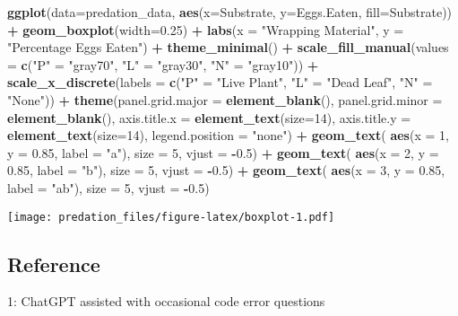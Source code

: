 \documentclass[
]{article}
\newenvironment{Shaded}{\begin{snugshade}}{\end{snugshade}}
\newcommand{\AttributeTok}[1]{\textcolor[rgb]{0.13,0.29,0.53}{#1}}
\newcommand{\DecValTok}[1]{\textcolor[rgb]{0.00,0.00,0.81}{#1}}
\newcommand{\FloatTok}[1]{\textcolor[rgb]{0.00,0.00,0.81}{#1}}
\newcommand{\FunctionTok}[1]{\textcolor[rgb]{0.13,0.29,0.53}{\textbf{#1}}}
\newcommand{\NormalTok}[1]{#1}
\newcommand{\OtherTok}[1]{\textcolor[rgb]{0.56,0.35,0.01}{#1}}
\newcommand{\SpecialCharTok}[1]{\textcolor[rgb]{0.81,0.36,0.00}{\textbf{#1}}}
\newcommand{\StringTok}[1]{\textcolor[rgb]{0.31,0.60,0.02}{#1}}
\begin{document}
\begin{Shaded}
\begin{Highlighting}[]
\FunctionTok{ggplot}\NormalTok{(}\AttributeTok{data=}\NormalTok{predation\_data, }\FunctionTok{aes}\NormalTok{(}\AttributeTok{x=}\NormalTok{Substrate, }\AttributeTok{y=}\NormalTok{Eggs.Eaten, }\AttributeTok{fill=}\NormalTok{Substrate)) }\SpecialCharTok{+}
  \FunctionTok{geom\_boxplot}\NormalTok{(}\AttributeTok{width=}\FloatTok{0.25}\NormalTok{) }\SpecialCharTok{+}
  \FunctionTok{labs}\NormalTok{(}\AttributeTok{x =} \StringTok{"Wrapping Material"}\NormalTok{, }\AttributeTok{y =} \StringTok{"Percentage Eggs Eaten"}\NormalTok{) }\SpecialCharTok{+}
  \FunctionTok{theme\_minimal}\NormalTok{() }\SpecialCharTok{+}
  \FunctionTok{scale\_fill\_manual}\NormalTok{(}\AttributeTok{values =} \FunctionTok{c}\NormalTok{(}\StringTok{"P"} \OtherTok{=} \StringTok{"gray70"}\NormalTok{, }\StringTok{"L"} \OtherTok{=} \StringTok{"gray30"}\NormalTok{, }\StringTok{"N"} \OtherTok{=} \StringTok{"gray10"}\NormalTok{)) }\SpecialCharTok{+} 
  \FunctionTok{scale\_x\_discrete}\NormalTok{(}\AttributeTok{labels =} \FunctionTok{c}\NormalTok{(}\StringTok{"P"} \OtherTok{=} \StringTok{"Live Plant"}\NormalTok{, }\StringTok{"L"} \OtherTok{=} \StringTok{"Dead Leaf"}\NormalTok{, }\StringTok{"N"} \OtherTok{=} \StringTok{"None"}\NormalTok{)) }\SpecialCharTok{+}
  \FunctionTok{theme}\NormalTok{(}\AttributeTok{panel.grid.major =} \FunctionTok{element\_blank}\NormalTok{(),}
        \AttributeTok{panel.grid.minor =} \FunctionTok{element\_blank}\NormalTok{(),}
        \AttributeTok{axis.title.x =} \FunctionTok{element\_text}\NormalTok{(}\AttributeTok{size=}\DecValTok{14}\NormalTok{),}
        \AttributeTok{axis.title.y =} \FunctionTok{element\_text}\NormalTok{(}\AttributeTok{size=}\DecValTok{14}\NormalTok{),}
        \AttributeTok{legend.position =} \StringTok{"none"}\NormalTok{) }\SpecialCharTok{+}
\FunctionTok{geom\_text}\NormalTok{(}
    \FunctionTok{aes}\NormalTok{(}\AttributeTok{x =} \DecValTok{1}\NormalTok{, }\AttributeTok{y =} \FloatTok{0.85}\NormalTok{, }\AttributeTok{label =} \StringTok{"a"}\NormalTok{), }
    \AttributeTok{size =} \DecValTok{5}\NormalTok{, }\AttributeTok{vjust =} \SpecialCharTok{{-}}\FloatTok{0.5}\NormalTok{) }\SpecialCharTok{+}  
  \FunctionTok{geom\_text}\NormalTok{(}
    \FunctionTok{aes}\NormalTok{(}\AttributeTok{x =} \DecValTok{2}\NormalTok{, }\AttributeTok{y =} \FloatTok{0.85}\NormalTok{, }\AttributeTok{label =} \StringTok{"b"}\NormalTok{), }
    \AttributeTok{size =} \DecValTok{5}\NormalTok{, }\AttributeTok{vjust =} \SpecialCharTok{{-}}\FloatTok{0.5}\NormalTok{) }\SpecialCharTok{+}  
  \FunctionTok{geom\_text}\NormalTok{(}
    \FunctionTok{aes}\NormalTok{(}\AttributeTok{x =} \DecValTok{3}\NormalTok{, }\AttributeTok{y =} \FloatTok{0.85}\NormalTok{, }\AttributeTok{label =} \StringTok{"ab"}\NormalTok{), }
    \AttributeTok{size =} \DecValTok{5}\NormalTok{, }\AttributeTok{vjust =} \SpecialCharTok{{-}}\FloatTok{0.5}\NormalTok{)}
\end{Highlighting}
\end{Shaded}

\texttt{[image: predation\_files/figure-latex/boxplot-1.pdf]}

\subsection{Reference}\label{reference}

1: ChatGPT assisted with occasional code error questions
\end{document}
